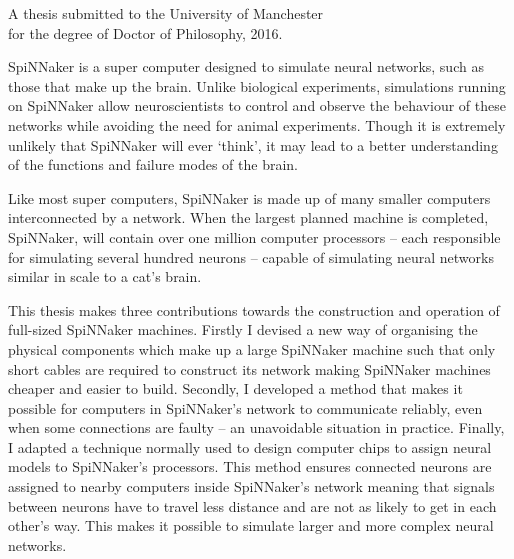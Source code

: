 {
	
	
	
	\vfill
	
	\begin{center}
		\textsc{\large\thesistitle}
		
		\vspace{0.5em}
		
		\thesisauthor
		
		\vspace{0.5em}
		
		A thesis submitted to the University of Manchester\\
		for the degree of Doctor of Philosophy, 2016.
	\end{center}
	
	\vfill
	
	
	SpiNNaker is a super computer designed to simulate neural networks, such as
	those that make up the brain. Unlike biological experiments, simulations
	running on SpiNNaker allow neuroscientists to control and observe the
	behaviour of these networks while avoiding the need for animal experiments.
	Though it is extremely unlikely that SpiNNaker will ever `think', it may lead
	to a better understanding of the functions and failure modes of the brain.
	
	Like most super computers, SpiNNaker is made up of many smaller computers
	interconnected by a network. When the largest planned machine is completed,
	SpiNNaker, will contain over one million computer processors -- each
	responsible for simulating several hundred neurons -- capable of simulating
	neural networks similar in scale to a cat's brain.
	
	This thesis makes three contributions towards the construction and operation
	of full-sized SpiNNaker machines. Firstly I devised a new way of organising
	the physical components which make up a large SpiNNaker machine such that
	only short cables are required to construct its network making SpiNNaker
	machines cheaper and easier to build. Secondly, I developed a method that
	makes it possible for computers in SpiNNaker's network to communicate
	reliably, even when some connections are faulty -- an unavoidable situation
	in practice.  Finally, I adapted a technique normally used to design computer
	chips to assign neural models to SpiNNaker's processors. This method ensures
	connected neurons are assigned to nearby computers inside SpiNNaker's network
	meaning that signals between neurons have to travel less distance and are not
	as likely to get in each other's way. This makes it possible to simulate
	larger and more complex neural networks.
	
	\par%
}
